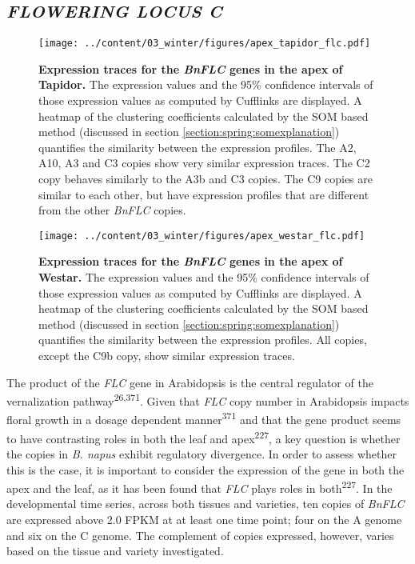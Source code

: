 \documentclass[12pt,]{book}
\begin{document}
\subsection{\texorpdfstring{\emph{FLOWERING LOCUS
C}}{FLOWERING LOCUS C}}\label{section:winter:flc}

\begin{figure}[htbp]
\centering
\texttt{[image: ../content/03\_winter/figures/apex\_tapidor\_flc.pdf]}
\caption{\textbf{Expression traces for the \emph{BnFLC} genes in the
apex of Tapidor.} The expression values and the 95\% confidence
intervals of those expression values as computed by Cufflinks are
displayed. A heatmap of the clustering coefficients calculated by the
SOM based method (discussed in section
\ref{section:spring:somexplanation}) quantifies the similarity between
the expression profiles. The A2, A10, A3 and C3 copies show very similar
expression traces. The C2 copy behaves similarly to the A3b and C3
copies. The C9 copies are similar to each other, but have expression
profiles that are different from the other \emph{BnFLC}
copies.}\label{figure:3xx:flctapapex}
\end{figure}

\begin{figure}[htbp]
\centering
\texttt{[image: ../content/03\_winter/figures/apex\_westar\_flc.pdf]}
\caption{\textbf{Expression traces for the \emph{BnFLC} genes in the
apex of Westar.} The expression values and the 95\% confidence intervals
of those expression values as computed by Cufflinks are displayed. A
heatmap of the clustering coefficients calculated by the SOM based
method (discussed in section \ref{section:spring:somexplanation})
quantifies the similarity between the expression profiles. All copies,
except the C9b copy, show similar expression
traces.}\label{figure:3xx:flcwesapex}
\end{figure}

The product of the \emph{FLC} gene in Arabidopsis is the central
regulator of the vernalization pathway\textsuperscript{26,371}. Given
that \emph{FLC} copy number in Arabidopsis impacts floral growth in a
dosage dependent manner\textsuperscript{371} and that the gene product
seems to have contrasting roles in both the leaf and
apex\textsuperscript{227}, a key question is whether the copies in
\emph{B. napus} exhibit regulatory divergence. In order to assess
whether this is the case, it is important to consider the expression of
the gene in both the apex and the leaf, as it has been found that
\emph{FLC} plays roles in both\textsuperscript{227}. In the
developmental time series, across both tissues and varieties, ten copies
of \emph{BnFLC} are expressed above 2.0 FPKM at at least one time point;
four on the A genome and six on the C genome. The complement of copies
expressed, however, varies based on the tissue and variety investigated.
\end{document}

